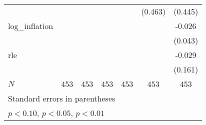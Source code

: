 {\begin{tabular}{l*{6}{c}}
            &                     &                     &                     &                     &     (0.463)         &     (0.445)         \\
\addlinespace
log\_inflation&                     &                     &                     &                     &                     &      -0.026         \\
            &                     &                     &                     &                     &                     &     (0.043)         \\
\addlinespace
rle         &                     &                     &                     &                     &                     &      -0.029         \\
            &                     &                     &                     &                     &                     &     (0.161)         \\
\midrule
\(N\)       &         453         &         453         &         453         &         453         &         453         &         453         \\
\bottomrule
\multicolumn{7}{l}{\footnotesize Standard errors in parentheses}\\
\multicolumn{7}{l}{\footnotesize \sym{*} \(p<0.10\), \sym{**} \(p<0.05\), \sym{***} \(p<0.01\)}\\
\end{tabular}
}
